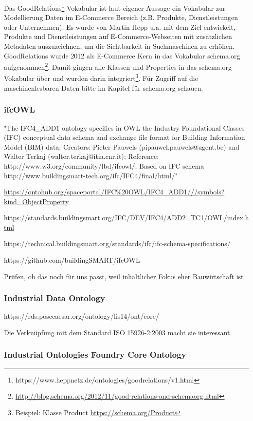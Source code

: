 \documentclass{article}
\begin{document}
Das GoodRelations\footnote{https://www.heppnetz.de/ontologies/goodrelations/v1.html} Vokabular ist laut eigener Aussage ein Vokabular zur Modellierung Daten im E-Commerce Bereich (z.B. Produkte, Dienstleistungen oder Unternehmen).
Es wurde von Martin Hepp u.a. mit dem Ziel entwickelt, Produkte und Dienstleistungen auf E-Commerce-Webseiten mit zusätzlichen Metadaten auszuzeichnen, um die Sichtbarkeit in Suchmaschinen zu erhöhen.
GoodRelations wurde 2012 als E-Commerce Kern in das Vokabular schema.org aufgenommen\footnote{\url{http://blog.schema.org/2012/11/good-relations-and-schemaorg.html}}.
Damit gingen alle Klassen und Properties in das schema.org Vokabular über und wurden darin integriert\footnote{Beispiel: Klasse Product \url{https://schema.org/Product}}.
Für Zugriff auf die maschinenlesbaren Daten bitte im Kapitel für schema.org schauen.

\subsubsection{ifcOWL}

"The IFC4\_ADD1 ontology specifies in OWL the Industry Foundational Classes (IFC) conceptual data schema and exchange file format for Building Information Model (BIM) data; Creators: Pieter Pauwels (pipauwel.pauwels@ugent.be) and Walter Terkaj (walter.terkaj@itia.cnr.it); Reference: http://www.w3.org/community/lbd/ifcowl/; Based on IFC schema http://www.buildingsmart-tech.org/ifc/IFC4/final/html/"

\url{https://ontohub.org/spaceportal/IFC%20OWL/IFC4_ADD1///symbols?kind=ObjectProperty}

\url{https://standards.buildingsmart.org/IFC/DEV/IFC4/ADD2_TC1/OWL/index.html}

https://technical.buildingsmart.org/standards/ifc/ifc-schema-specifications/

https://github.com/buildingSMART/ifcOWL

Prüfen, ob das noch für uns passt, weil inhaltlicher Fokus eher Bauwirtschaft ist

\subsubsection{Industrial Data Ontology}

https://rds.posccaesar.org/ontology/lis14/ont/core/

Die Verknüpfung mit dem Standard ISO 15926-2:2003 macht sie interessant

\subsubsection{Industrial Ontologies Foundry Core Ontology}
\end{document}
